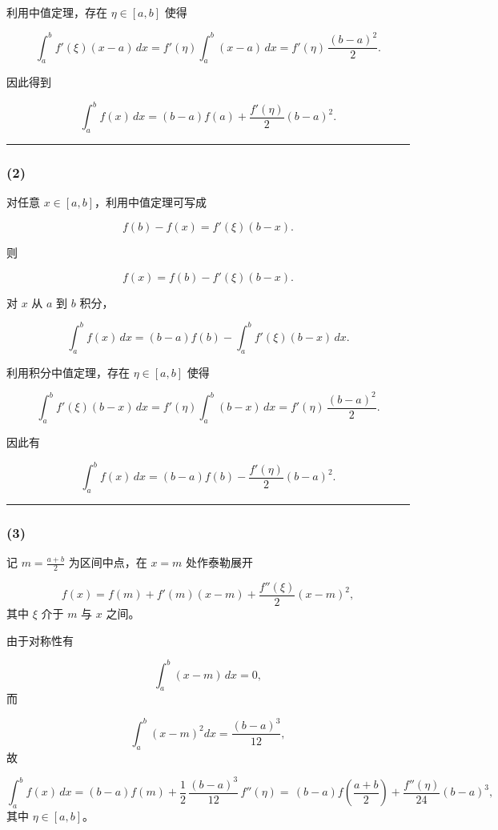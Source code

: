 \documentclass[11pt]{article}
\begin{document}
利用中值定理，存在 \(\eta\in[a,b]\) 使得

\[
\int_a^b f'(\xi)(x-a)\,dx = f'(\eta)\int_a^b (x-a)\,dx = f'(\eta)\,\frac{(b-a)^2}{2}.
\]

因此得到

\[
\int_a^b f(x)\,dx = (b-a) f(a) + \frac{f'(\eta)}{2}(b-a)^2.
\]

\begin{center}\rule{0.5\linewidth}{0.5pt}\end{center}

\subsubsection{(2)}\label{section-2}

对任意 \(x\in[a,b]\)，利用中值定理可写成

\[
f(b)-f(x)=f'(\xi)(b-x).
\]

则

\[
f(x)=f(b)-f'(\xi)(b-x).
\]

对 \(x\) 从 \(a\) 到 \(b\) 积分，

\[
\int_a^b f(x)\,dx = (b-a)f(b) - \int_a^b f'(\xi)(b-x)\,dx.
\]

利用积分中值定理，存在 \(\eta\in[a,b]\) 使得

\[
\int_a^b f'(\xi)(b-x)\,dx = f'(\eta)\int_a^b (b-x)\,dx = f'(\eta)\,\frac{(b-a)^2}{2}.
\]

因此有

\[
\int_a^b f(x)\,dx = (b-a)f(b) - \frac{f'(\eta)}{2}(b-a)^2.
\]

\begin{center}\rule{0.5\linewidth}{0.5pt}\end{center}

\subsubsection{(3)}\label{section-3}

记 \(m=\frac{a+b}{2}\) 为区间中点，在 \(x=m\) 处作泰勒展开

\[
f(x)=f(m)+f'(m)(x-m)+\frac{f''(\xi)}{2}(x-m)^2,
\] 其中 \(\xi\) 介于 \(m\) 与 \(x\) 之间。

由于对称性有

\[
\int_a^b (x-m)\,dx=0,
\] 而

\[
\int_a^b (x-m)^2 dx = \frac{(b-a)^3}{12},
\] 故

\[
\int_a^b f(x)\,dx = (b-a)f(m)+\frac{1}{2}\,\frac{(b-a)^3}{12}\,f''(\eta)
=\,(b-a)f\left(\frac{a+b}{2}\right) + \frac{f''(\eta)}{24}(b-a)^3,
\] 其中 \(\eta\in[a,b]\)。
\end{document}
